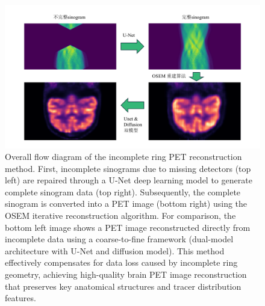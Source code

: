 \documentclass[
reprint,
superscriptaddress,
nofootinbib,
amsmath,amssymb,
aps,
prd,
]{revtex4-2}
\begin{document}
\begin{figure}[ht]
    \centering
    \includegraphics[width=\textwidth]{Images/reconstruction_workflow}
    \vspace{-.5cm}
    \caption{Overall flow diagram of the incomplete ring PET reconstruction method. First, incomplete sinograms due to missing detectors (top left) are repaired through a U-Net deep learning model to generate complete sinogram data (top right). Subsequently, the complete sinogram is converted into a PET image (bottom right) using the OSEM iterative reconstruction algorithm. For comparison, the bottom left image shows a PET image reconstructed directly from incomplete data using a coarse-to-fine framework (dual-model architecture with U-Net and diffusion model). This method effectively compensates for data loss caused by incomplete ring geometry, achieving high-quality brain PET image reconstruction that preserves key anatomical structures and tracer distribution features.}
    \vspace{-.2cm}
    \label{fig:reconstruction_workflow}
\end{figure}

\end{document}
